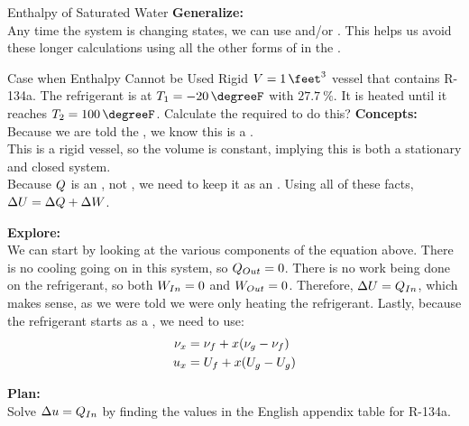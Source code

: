\begin{example}{Enthalpy of Saturated Water}
  \textbf{Generalize:} \\
  Any time the system is changing states, we can use  and/or .
  This helps us avoid these longer calculations using all the other forms of  in the .
\end{example}

\begin{example}{Case when Enthalpy Cannot be Used}
  Rigid $\Volume = \SI{1}{\feet\cubed}$ vessel that contains R-134a.
  The refrigerant is at $\Temp_{1} = \SI{-20}{\degreeF}$ with  $\SI{27.7}{\percent}$.
  It is heated until it reaches $\Temp_{2} = \SI{100}{\degreeF}$.
  Calculate the  required to do this?
  \tcblower{}
  \textbf{Concepts:} \\
  Because we are told the , we know this is a . \\
  This is a rigid vessel, so the volume is constant, implying this is both a stationary and closed system. \\
  Because $Q$ is an , not , we need to keep it as an .
  Using all of these facts, $\Delta U = \Delta Q + \Delta W$.

  \textbf{Explore:} \\
  We can start by looking at the various components of the equation above.
  There is no cooling going on in this system, so $Q_{Out} = 0$.
  There is no work being done on the refrigerant, so both $W_{In} = 0$ and $W_{Out} = 0$.
  Therefore, $\Delta U = Q_{In}$, which makes sense, as we were told we were only heating the refrigerant.
  Lastly, because the refrigerant starts as a , we need to use:
  \begin{align*}
    \nu_{x} &= \nu_{f} + x (\nu_{g} - \nu_{f}) \\
    u_{x} &= U_{f} + x (U_{g} - U_{g})
  \end{align*}

  \textbf{Plan:} \\
  Solve $\Delta u = Q_{In}$ by finding the  values in the English appendix table for R-134a.


\end{example}
